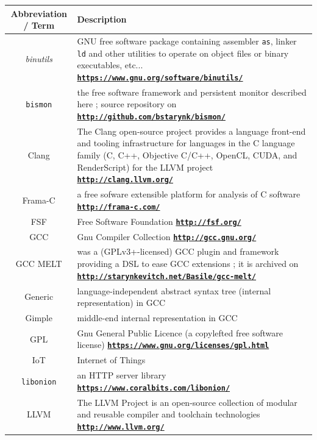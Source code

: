 \documentclass[11pt,a4paper,svgnames]{article}
\newcommand{\bmurl}[1]{{\href{#1}{\texttt{\textbf{#1}}}}}
\begin{document}
\begin{tabular}{|c|p{}|}
  \hline
  \begin{minipage}{0.15\textwidth}

    \smallskip
    
    \textbf{Abbreviation / Term}

    \smallskip
    
  \end{minipage} & \textbf{Description} \\
  \hline \emph{binutils} & GNU free software package containing assembler \texttt{as}, linker \texttt{ld} and other utilities to operate on object files or binary executables, etc... \bmurl{https://www.gnu.org/software/binutils/} \\
  \hline \texttt{bismon} & the free software framework and persistent monitor described here ; source repository on \bmurl{http://github.com/bstarynk/bismon/} \\
  \hline Clang & The Clang open-source project provides a language front-end and tooling infrastructure for languages in the C language family (C, C++, Objective C/C++, OpenCL, CUDA, and RenderScript) for the LLVM project \bmurl{http://clang.llvm.org/} \\
  \hline Frama-C &  a free sofware extensible platform for analysis of C software \bmurl{http://frama-c.com/} \\
  \hline FSF & Free Software Foundation \bmurl{http://fsf.org/} \\
  \hline GCC & Gnu Compiler Collection \bmurl{http://gcc.gnu.org/} \\
  \hline GCC MELT & was a (GPLv3+-licensed) GCC plugin and framework providing a DSL to ease GCC extensions ; it is archived on \bmurl{http://starynkevitch.net/Basile/gcc-melt/}\\
  \hline Generic & language-independent abstract syntax tree (internal representation) in GCC \\
  \hline Gimple & middle-end internal representation in GCC \\
  \hline GPL & Gnu General Public Licence (a copylefted free software license) \bmurl{https://www.gnu.org/licenses/gpl.html} \\
  \hline IoT & Internet of Things \\
  \hline \texttt{libonion} & an HTTP server library \bmurl{https://www.coralbits.com/libonion/} \\
  \hline LLVM & The LLVM Project is an open-source collection of modular and reusable compiler and toolchain technologies \bmurl{http://www.llvm.org/} \\

\end{tabular}
\end{document}

